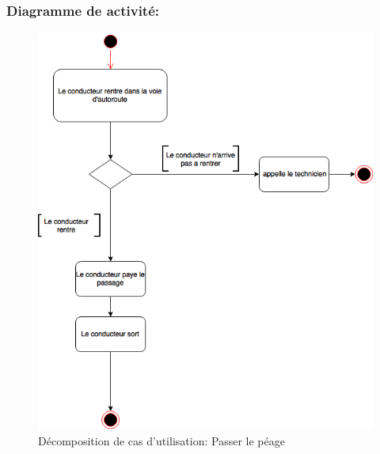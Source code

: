 \subsubsection{\textbf{Diagramme de activité:}}
\begin{figure}[h]
    \centering
    \includegraphics[scale=0.6]{02_Desenvolvimento/TD2/images/DAPasserPeage.png}
    \caption{Décomposition de cas d'utilisation: Passer le péage}
\end{figure}